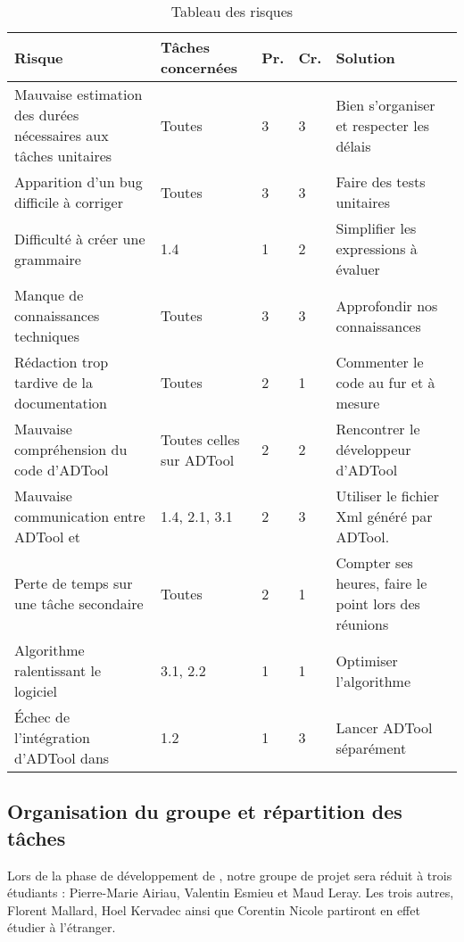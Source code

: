 	\begin{table}[H]
		\centering
		\begin{tabular}{|p{4cm}|l|l|l|p{4cm}|}
		\hline
            \textbf{Risque} & \textbf{Tâches concernées} & \textbf{Pr.} & \textbf{Cr.} & \textbf{Solution}\\
            \hline
            Mauvaise estimation des durées nécessaires aux tâches unitaires & 
                Toutes & 3 & 3 &
                Bien s'organiser et respecter les délais\\ 
            \hline
            Apparition d'un bug difficile à corriger & 
                Toutes & 3 & 3 &
                Faire des tests unitaires\\
            \hline
            Difficulté à créer une grammaire & 
                1.4 & 1 & 2 &
                Simplifier les expressions à évaluer\\ 
            \hline
            Manque de connaissances techniques & 
                Toutes & 3 & 3 &
                Approfondir nos connaissances\\ 
            \hline
            Rédaction trop tardive de la documentation & 
                Toutes & 2 & 1 &
                Commenter le code au fur et à mesure\\
            \hline
            Mauvaise compréhension du code d'ADTool & 
                Toutes celles sur ADTool & 2 & 2 &
                Rencontrer le développeur d'ADTool\\ 
            \hline
            Mauvaise communication entre ADTool et \glasir{} & 
                1.4, 2.1, 3.1 & 2 & 3 &
                Utiliser le fichier Xml généré par ADTool.\\ 
            \hline
            Perte de temps sur une tâche secondaire & 
                Toutes & 2 & 1 &
                Compter ses heures, faire le point lors des réunions\\ 
            \hline
            Algorithme ralentissant le logiciel & 
                3.1, 2.2 & 1 & 1 &
                Optimiser l’algorithme\\ 
            \hline
            Échec de l'intégration d'ADTool dans \glasir{} & 
                1.2 & 1 & 3 &
                Lancer ADTool séparément\\ 
            \hline
		\end{tabular}
		\caption{Tableau des risques}
		\label{fig:risques}
	\end{table}
	
	\subsection{Organisation du groupe et répartition des tâches}
		Lors de la phase de développement de \glasir{}, notre groupe de projet sera réduit à trois étudiants : Pierre-Marie {\sc Airiau}, Valentin {\sc Esmieu} et Maud {\sc Leray}. Les trois autres, Florent {\sc Mallard}, Hoel {\sc Kervadec} ainsi que Corentin {\sc Nicole} partiront en effet étudier à l'étranger.
		
